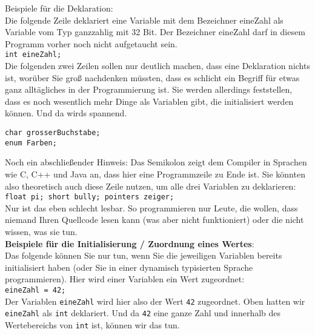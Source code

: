 Beispiele für die Deklaration:\\

Die folgende Zeile deklariert eine Variable mit dem Bezeichner eineZahl als Variable vom Typ ganzzahlig mit 32 Bit. Der Bezeichner \glqq{}eineZahl\grqq{} darf in diesem Programm vorher noch nicht aufgetaucht sein.\\

\verb|int eineZahl;|\\

Die folgenden zwei Zeilen sollen nur deutlich machen, dass eine Deklaration nichts ist, worüber Sie groß nachdenken müssten, dass es schlicht ein Begriff für etwas ganz alltägliches in der Programmierung ist. Sie werden allerdings feststellen, dass es noch wesentlich mehr Dinge als Variablen gibt, die initialisiert werden können. Und da wirds spannend.

\begin{verbatim}
char grosserBuchstabe;
enum Farben;
\end{verbatim}

Noch ein abschließender Hinweis: Das Semikolon zeigt dem Compiler in Sprachen wie C, C++ und Java an, dass hier eine Programmzeile zu Ende ist. Sie könnten also theoretisch auch diese Zeile nutzen, um alle drei Variablen zu deklarieren:\\

\verb|float pi; short bully; pointers zeiger;|\\

Nur ist das eben schlecht lesbar. So programmieren nur Leute, die wollen, dass niemand Ihren Quellcode lesen kann (was aber nicht funktioniert) oder die nicht wissen, was sie tun.\\

\textbf{Beispiele für die Initialisierung / Zuordnung eines Wertes}:\\

Das folgende können Sie nur tun, wenn Sie die jeweiligen Variablen bereits initialisiert haben (oder Sie in einer dynamisch typisierten Sprache programmieren). Hier wird einer Variablen ein Wert zugeordnet:\\

\verb|eineZahl = 42;|\\

Der Variablen \verb|eineZahl| wird hier also der Wert \verb|42| zugeordnet. Oben hatten wir \verb|eineZahl| als \verb|int| deklariert. Und da \verb|42| eine ganze Zahl und innerhalb des Wertebereichs von \verb|int| ist, können wir das tun.\\

